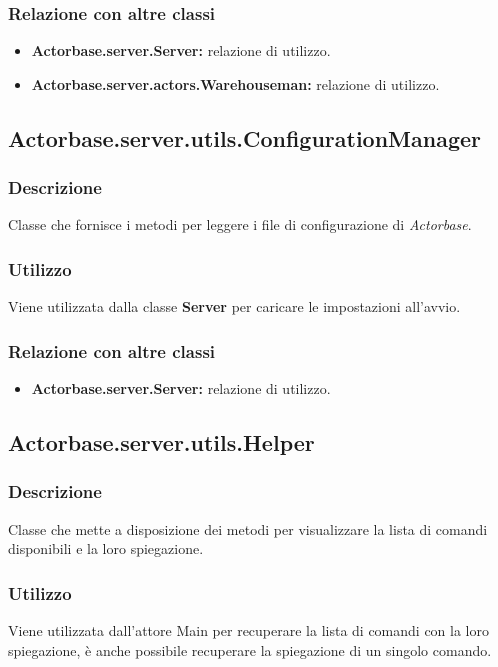 \documentclass[a4paper]{article}
\begin{document}
			\subsubsection{Relazione con altre classi}
				\begin{itemize}
					\item \textbf{Actorbase.server.Server:} relazione di utilizzo.
					\item \textbf{Actorbase.server.actors.Warehouseman:} relazione di utilizzo.
				\end{itemize}
				
				\subsection{Actorbase.server.utils.ConfigurationManager}
			\subsubsection{Descrizione}
				Classe che fornisce i metodi per leggere i file di configurazione di \emph{Actorbase}.
				
			\subsubsection{Utilizzo}
				Viene utilizzata dalla classe \textbf{Server} per caricare le impostazioni all'avvio.
				
			\subsubsection{Relazione con altre classi}
				\begin{itemize}
					\item \textbf{Actorbase.server.Server:} relazione di utilizzo.
				\end{itemize}
				
		\subsection{Actorbase.server.utils.Helper}
			\subsubsection{Descrizione}
				Classe che mette a disposizione dei metodi per visualizzare la lista di comandi disponibili e la loro spiegazione.
				
			\subsubsection{Utilizzo}
				Viene utilizzata dall'attore Main per recuperare la lista di comandi con la loro spiegazione, è anche possibile recuperare 
				la spiegazione di un singolo comando.
				
\end{document}
